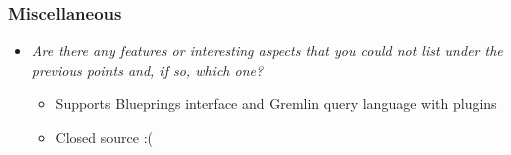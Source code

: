 
\begin{frame}
\frametitle{Miscellaneous}
\begin{itemize}
\item \emph{Are there any features or interesting aspects that you could not list under the previous points and, if so, which one?}
\begin{itemize}
	\item Supports Blueprings interface and Gremlin query language with plugins
	\item Closed source :(
\end{itemize}
\end{itemize}
\end{frame} 